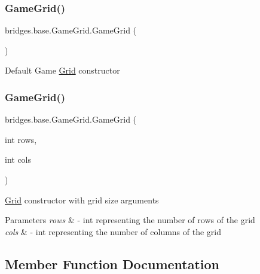 \subsubsection{\texorpdfstring{GameGrid()}{GameGrid()}\hspace{0.1cm}{\footnotesize\ttfamily [1/2]}}
{\footnotesize\ttfamily bridges.\+base.\+Game\+Grid.\+Game\+Grid (\begin{DoxyParamCaption}{ }\end{DoxyParamCaption})}

Default Game \mbox{\hyperlink{classbridges_1_1base_1_1_grid}{Grid}} constructor \mbox{\label{classbridges_1_1base_1_1_game_grid_acfe6d52979dae94b1d883fed4965feb3}} 
\subsubsection{\texorpdfstring{GameGrid()}{GameGrid()}\hspace{0.1cm}{\footnotesize\ttfamily [2/2]}}
{\footnotesize\ttfamily bridges.\+base.\+Game\+Grid.\+Game\+Grid (\begin{DoxyParamCaption}\item[{int}]{rows,  }\item[{int}]{cols }\end{DoxyParamCaption})}

\mbox{\hyperlink{classbridges_1_1base_1_1_grid}{Grid}} constructor with grid size arguments


\begin{DoxyParams}{Parameters}
{\em rows} & -\/ int representing the number of rows of the grid \\
\hline
{\em cols} & -\/ int representing the number of columns of the grid \\
\hline
\end{DoxyParams}


\subsection{Member Function Documentation}
\mbox{\label{classbridges_1_1base_1_1_game_grid_a8eee4918e2cbfc956a92a39252590114}} 
